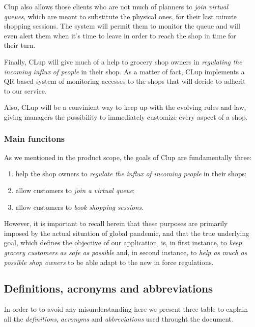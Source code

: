 Clup also allows those clients who are not much of planners to \textit{join virtual queues}, which are meant to substitute the physical ones, for their last minute shopping sessions. The system will permit them to monitor the queue and will even alert them when it’s time to leave in order to reach the shop in time for their turn.

Finally, CLup will give much of a help to grocery shop owners in \textit{regulating the incoming influx of people} in their shop. As a matter of fact, CLup implements a QR based system of monitoring accesses to the shops that will decide to adherit to our service. 

Also, CLup will be a convinient way to keep up with the evolving rules and law, giving managers the possibility to immediately customize every aspect of a shop.

\subsubsection{Main funcitons}
\label{subsect:mainfunctions}

As we mentioned in the product scope, the goals of Clup are fundamentally three: 
\begin{enumerate}[topsep=0pt]
    \item help the shop owners to \textit{regulate the influx of incoming people} in their shops;
    \item allow customers to \textit{join a virtual queue};
    \item allow customers to \textit{book shopping sessions}.
\end{enumerate}

However, it is important to recall herein that these purposes are primarily imposed by the actual situation of global pandemic, and that the true underlying goal, which defines the objective of our application, is, in first instance, to \textit{keep grocery customers as safe as possible} and, in second instance, to \textit{help as much as possible shop owners} to be able adapt to the new in force regulations.

\subsection{Definitions, acronyms and abbreviations}
\label{subsect:definitionsacronymsabbreviations}

In order to to avoid any misunderstanding here we present three table to explain all the \textit{definitions}, \textit{acronyms} and \textit{abbreviations} used throught the document.

